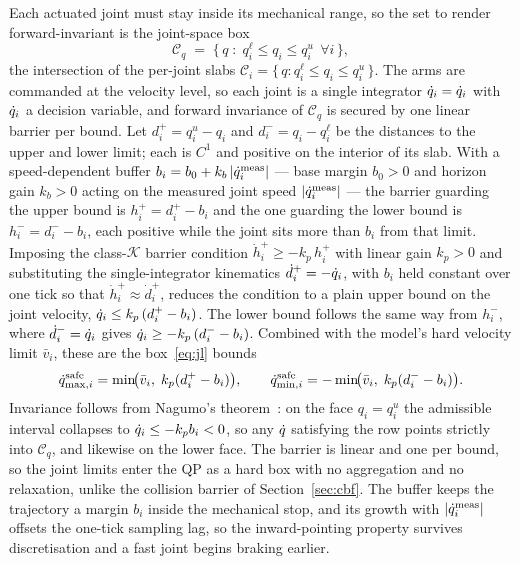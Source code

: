 Each actuated joint must stay inside its mechanical range, so the set to render forward-invariant is the joint-space box
\begin{equation}
\mathcal{C}_q \;=\; \bigl\{\, q \;:\; q_i^{\ell} \le q_i \le q_i^{u}\ \ \forall i \,\bigr\},
\label{eq:jlset}
\end{equation}
the intersection of the per-joint slabs $\mathcal{C}_i = \{\,q : q_i^{\ell} \le q_i \le q_i^{u}\,\}$. The arms are commanded at the velocity level, so each joint is a single integrator $\dot{q}_i = \dot{q}_i$ with $\dot{q}_i$ a decision variable, and forward invariance of $\mathcal{C}_q$ is secured by one linear barrier per bound. Let $d_i^{+} = q_i^{u} - q_i$ and $d_i^{-} = q_i - q_i^{\ell}$ be the distances to the upper and lower limit; each is $C^1$ and positive on the interior of its slab. With a speed-dependent buffer $b_i = b_0 + k_b\,\lvert\dot{q}_i^{\text{meas}}\rvert$ --- base margin $b_0 > 0$ and horizon gain $k_b > 0$ acting on the measured joint speed $\lvert\dot{q}_i^{\text{meas}}\rvert$ --- the barrier guarding the upper bound is $h_i^{+} = d_i^{+} - b_i$ and the one guarding the lower bound is $h_i^{-} = d_i^{-} - b_i$, each positive while the joint sits more than $b_i$ from that limit. Imposing the class-$\mathcal{K}$ barrier condition $\dot{h}_i^{+} \ge -k_p\,h_i^{+}$ with linear gain $k_p > 0$ and substituting the single-integrator kinematics $\dot{d}_i^{+} = -\dot{q}_i$, with $b_i$ held constant over one tick so that $\dot{h}_i^{+} \approx \dot{d}_i^{+}$, reduces the condition to a plain upper bound on the joint velocity, $\dot{q}_i \le k_p\,(d_i^{+} - b_i)$. The lower bound follows the same way from $h_i^{-}$, where $\dot{d}_i^{-} = \dot{q}_i$ gives $\dot{q}_i \ge -k_p\,(d_i^{-} - b_i)$. Combined with the model's hard velocity limit $\bar{v}_i$, these are the box~\eqref{eq:jl} bounds
\begin{equation}
\dot{q}_{\max,i}^{\text{safe}} = \min\!\bigl(\bar{v}_i,\; k_p(d_i^{+} - b_i)\bigr),
\qquad
\dot{q}_{\min,i}^{\text{safe}} = -\min\!\bigl(\bar{v}_i,\; k_p(d_i^{-} - b_i)\bigr).
\label{eq:jlbrake}
\end{equation}
Invariance follows from Nagumo's theorem~\cite{blanchini1999,ames2019ecc}: on the face $q_i = q_i^{u}$ the admissible interval collapses to $\dot{q}_i \le -k_p b_i < 0$, so any $\dot{q}$ satisfying the row points strictly into $\mathcal{C}_q$, and likewise on the lower face. The barrier is linear and one per bound, so the joint limits enter the QP as a hard box with no aggregation and no relaxation, unlike the collision barrier of Section~\ref{sec:cbf}. The buffer keeps the trajectory a margin $b_i$ inside the mechanical stop, and its growth with $\lvert\dot{q}_i^{\text{meas}}\rvert$ offsets the one-tick sampling lag, so the inward-pointing property survives discretisation and a fast joint begins braking earlier.

